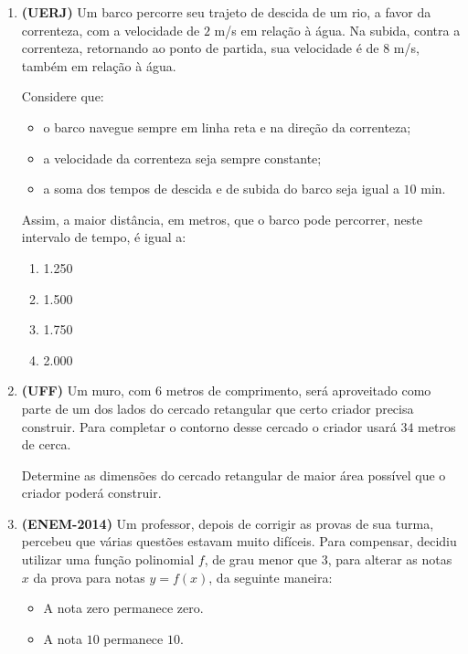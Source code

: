 \begin{enumerate}
\item \textbf{(UERJ)} Um barco percorre seu trajeto de descida de um rio, a favor da correnteza, com a velocidade de \(2\) m/s em relação à água. Na subida, contra a correnteza, retornando ao ponto de partida, sua velocidade é de \(8\) m/s, também em relação à água.

Considere que:
\begin{itemize}
\item {} 
o barco navegue sempre em linha reta e na direção da correnteza;

\item {} 
a velocidade da correnteza seja sempre constante;

\item {} 
a soma dos tempos de descida e de subida do barco seja igual a \(10\) min.

\end{itemize}

Assim, a maior distância, em metros, que o barco pode percorrer, neste intervalo de tempo, é igual a:

\begin{enumerate}
\item 1.250
\item 1.500
\item 1.750
\item 2.000 
\end{enumerate}

\needspace{10em}
\item \textbf{(UFF)} Um muro, com \(6\) metros de comprimento, será aproveitado como parte de um dos lados do cercado retangular que certo criador precisa construir. Para completar o contorno desse cercado o criador usará \(34\) metros de cerca.

Determine as dimensões do cercado retangular de maior área possível que o criador poderá construir.

\item \textbf{(ENEM-2014)} Um professor, depois de corrigir as provas de sua turma, percebeu que várias questões estavam muito difíceis. Para compensar, decidiu utilizar uma função polinomial \(f\), de grau menor que \(3\), para alterar as notas \(x\) da prova para notas \(y = f(x)\), da seguinte maneira:
\begin{itemize}
\item {} 
A nota zero permanece zero.

\item {} 
A nota \(10\) permanece \(10\).


\end{itemize}
\end{enumerate}

